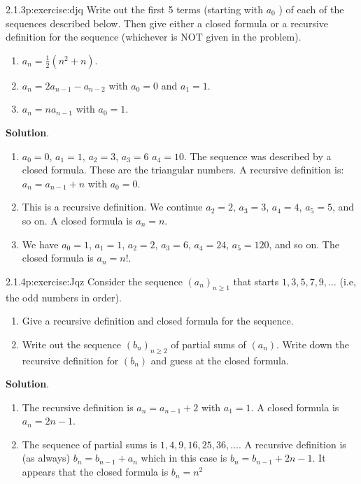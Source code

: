\documentclass[twoside,11pt,]{book}
\newcommand{\blocktitlefont}{\relax}
\numberwithin{equation}{chapter}
\begin{document}
\begin{divisionsolution}{2.1.3}{}{p:exercise:djq}%
Write out the first 5 terms (starting with \(a_0\) ) of each of the sequences described below. Then give either a closed formula or a recursive definition for the sequence (whichever is NOT given in the problem).%
\begin{enumerate}[label=(\alph*)]
\item{}\(a_n = \frac{1}{2}(n^2 + n)\).%
\item{}\(a_n = 2a_{n-1} - a_{n-2}\) with \(a_0 = 0\) and \(a_1 = 1\).%
\item{}\(a_n = na_{n-1}\) with \(a_0 = 1\).%
\end{enumerate}
%
\par\smallskip%
\noindent\textbf{\blocktitlefont Solution}.\quad{}%
\begin{enumerate}[label=(\alph*)]
\item{}\(a_0 = 0\), \(a_1 = 1\), \(a_2 = 3\), \(a_3 = 6\) \(a_4 = 10\). The sequence was described by a closed formula. These are the triangular numbers. A recursive definition is: \(a_n = a_{n-1} + n\) with \(a_0 = 0\).%
\item{}This is a recursive definition. We continue \(a_2 = 2\), \(a_3 = 3\), \(a_4 = 4\), \(a_5 = 5\), and so on. A closed formula is \(a_n = n\).%
\item{}We have \(a_0 = 1\), \(a_1 = 1\), \(a_2 = 2\), \(a_3 = 6\), \(a_4 = 24\), \(a_5 = 120\), and so on. The closed formula is \(a_n = n!\).%
\end{enumerate}
%
\end{divisionsolution}%
\begin{divisionsolution}{2.1.4}{}{p:exercise:Jqz}%
Consider the sequence \((a_n)_{n \ge 1}\) that starts \(1, 3, 5, 7, 9, \ldots\) (i.e, the odd numbers in order).%
\begin{enumerate}[label=(\alph*)]
\item{}Give a recursive definition and closed formula for the sequence.%
\item{}Write out the sequence \((b_n)_{n \ge 2}\) of partial sums of \((a_n)\).  Write down the recursive definition for \((b_n)\) and guess at the closed formula.%
\end{enumerate}
%
\par\smallskip%
\noindent\textbf{\blocktitlefont Solution}.\quad{}%
\begin{enumerate}[label=(\alph*)]
\item{}The recursive definition is \(a_n = a_{n-1} + 2\) with \(a_1 = 1\).  A closed formula is \(a_n = 2n-1\).%
\item{}The sequence of partial sums is \(1, 4, 9, 16, 25, 36, \ldots\).  A recursive definition is (as always) \(b_n = b_{n-1} + a_n\) which in this case is \(b_n = b_{n-1} + 2n-1\).  It appears that the closed formula is \(b_n = n^2\)%
\end{enumerate}
%
\end{divisionsolution}%
\end{document}
